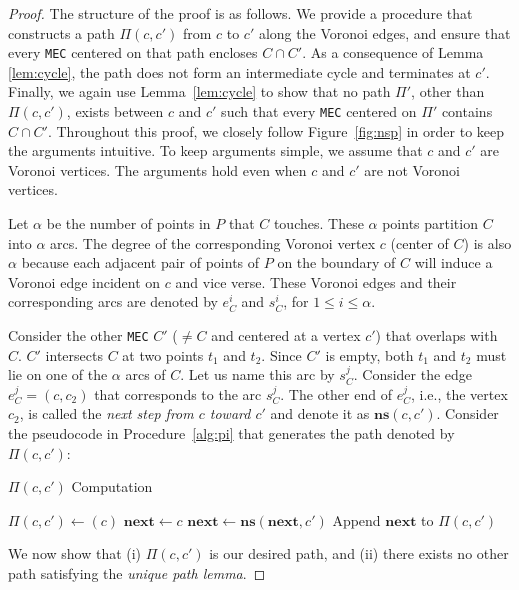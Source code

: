 \documentclass[12pt]{llncs}
\begin{document}
\begin{proof}
 The structure of the proof is as follows. We provide a procedure that 
constructs a path $\Pi(c,c')$ from $c$ to $c'$ along the Voronoi
edges, and ensure that every {\tt MEC} centered on that path encloses $C
\cap C'$. As a consequence of Lemma \ref{lem:cycle}, the path does not
form an intermediate cycle and terminates at $c'$. Finally, we again
use Lemma~\ref{lem:cycle} to show that no path $\Pi'$, other than
$\Pi(c,c')$, exists between $c$ and $c'$ such that every {\tt MEC} centered
on $\Pi'$ contains $C \cap C'$. Throughout this proof, we closely follow
Figure~\ref{fig:nsp} in order to keep the arguments intuitive. To keep
arguments simple, we assume that $c$ and $c'$ are Voronoi vertices. The arguments 
hold 
even
when $c$ and $c'$ are not Voronoi vertices. 

Let $\alpha$ be the number of points in $P$ that $C$  touches. These
$\alpha$ points partition  $C$ into $\alpha$ arcs. The degree of
the corresponding Voronoi vertex $c$ (center of $C$) is also $\alpha$ because each
adjacent pair of points of $P$ on the boundary of $C$ will
induce a Voronoi edge incident on $c$ and vice verse. These Voronoi
edges and their corresponding arcs are denoted by $e^i_C$ and $s^i_C$,
for $1 \le i \le \alpha$.


Consider the other  {\tt MEC} $C'$ ($\neq C$ and centered at a vertex $c'$)
that overlaps with $C$. $C'$ intersects $C$ at two points $t_1$ and
$t_2$. Since $C'$ is empty, both $t_1$ and $t_2$ must lie on one of the $\alpha$ arcs 
of
$C$. Let us name this arc by $s^j_C$.
Consider the edge $e^j_C = (c,c_2)$ that corresponds to the arc
$s^j_C$. The other end of $e^j_C$, i.e., the vertex $c_2$, is called
the {\em next step from $c$ toward $c'$} and denote it as
$\mathbf{ns}(c,c')$. Consider the pseudocode in Procedure~\ref{alg:pi} that generates 
the 
path
denoted by $\Pi(c,c')$:


\begin{algorithm}[h!]
\caption{$\Pi(c,c')$ Computation}
\label{alg:pi}
\begin{algorithmic}[1]
\STATE $\Pi(c,c') \leftarrow (c)$
\STATE $\mathbf{next} \leftarrow c$
\REPEAT
\STATE $\mathbf{next} \leftarrow \mathbf{ns}(\mathbf{next},c')$
\STATE Append $\mathbf{next}$ to $\Pi(c,c')$
\end{algorithmic}
\end{algorithm}

We now show that (i) $\Pi(c,c')$ is our desired path, and 
(ii) there exists no other path satisfying the {\it unique path lemma}.


\end{proof}
\end{document}

